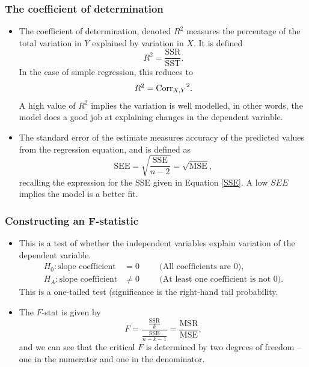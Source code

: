 \documentclass[../notes_compiled.tex]{subfiles}
\begin{document}
\subsubsection{The coefficient of determination}
\begin{itemize}
\item The coefficient of determination, denoted $R^{2}$ measures the percentage of the total variation in $Y$ explained by variation in $X$. It is defined
\begin{equation}
R^{2} = \frac{\mathrm{SSR}}{\mathrm{SST}}.
\end{equation}
In the case of simple regression, this reduces to 
\begin{equation}
R^{2} = {\operatorname{Corr}_{X,Y}}^{2}.
\end{equation}
A high value of $R^{2}$ implies the variation is well modelled, in other words, the model does a good job at explaining changes in the dependent variable.
\item The standard error of the estimate measures accuracy of the predicted values from the regression equation, and is defined as 
\begin{equation}
\mathrm{SEE} = \sqrt{\frac{\mathrm{SSE}}{n-2}} = \sqrt{\mathrm{MSE}},
\end{equation}
recalling the expression for the SSE given in Equation \ref{SSE}. A low $SEE$ implies the model is a better fit.
\end{itemize}
\subsubsection{Constructing an F-statistic}
\begin{itemize}
\item This is a test of whether the independent variables explain variation of the dependent variable. 
\begin{align*}
H_{0}: \text{slope coefficient}&=0 \hspace{1cm}\text{(All coefficients are 0)}, \\
H_{A}: \text{slope coefficient}&\neq0 \hspace{1cm}\text{(At least one coefficient is not 0)}.
\end{align*}
This is a one-tailed test (significance is the right-hand tail probability.
\item The $F$-stat is given by 
\begin{equation}
F=\frac{\frac{\mathrm{SSR}}{k}}{\frac{\mathrm{SSE}}{n-k-1}}=\frac{\mathrm{MSR}}{\mathrm{MSE}},
\end{equation}
and we can see that the critical $F$ is determined by two degrees of freedom -- one in the numerator and one in the denominator.
\end{itemize}
\end{document}
